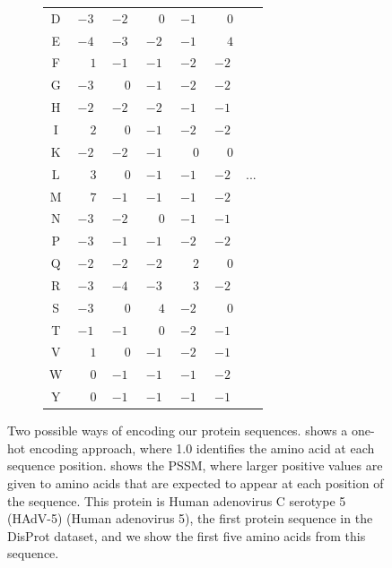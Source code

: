 \documentclass{l4proj}
\begin{document}
\begin{figure}[!ht]
\begin{subfigure}[h]{0.45\textwidth}
\begin{tabular}{|c|cccccc|}
        D & $-3$ & $-2$ & $\phantom{-}0$ & $-1$ & $\phantom{-}0$ & \\
        E & $-4$ & $-3$ & $-2$ & $-1$ & $\phantom{-}4$ & \\
        F & $\phantom{-}1$ & $-1$ & $-1$ & $-2$ & $-2$ & \\
        G & $-3$ & $\phantom{-}0$ & $-1$ & $-2$ & $-2$ & \\
        H & $-2$ & $-2$ & $-2$ & $-1$ & $-1$ & \\
        I & $\phantom{-}2$ & $\phantom{-}0$ & $-1$ & $-2$ & $-2$ & \\
        K & $-2$ & $-2$ & $-1$ & $\phantom{-}0$ & $\phantom{-}0$ & \\
        L & $\phantom{-}3$ & $\phantom{-}0$ & $-1$ & $-1$ & $-2$ & ... \\
        M & $\phantom{-}7$ & $-1$ & $-1$ & $-1$ & $-2$ & \\
        N & $-3$ & $-2$ & $\phantom{-}0$ & $-1$ & $-1$ & \\
        P & $-3$ & $-1$ & $-1$ & $-2$ & $-2$ & \\
        Q & $-2$ & $-2$ & $-2$ & $\phantom{-}2$ & $\phantom{-}0$ & \\
        R & $-3$ & $-4$ & $-3$ & $\phantom{-}3$ & $-2$ & \\
        S & $-3$ & $\phantom{-}0$ & $\phantom{-}4$ & $-2$ & $\phantom{-}0$ & \\
        T & $-1$ & $-1$ & $\phantom{-}0$ & $-2$ & $-1$ & \\
        V & $\phantom{-}1$ & $\phantom{-}0$ & $-1$ & $-2$ & $-1$ & \\
        W & $\phantom{-}0$ & $-1$ & $-1$ & $-1$ & $-2$ & \\
        Y & $\phantom{-}0$ & $-1$ & $-1$ & $-1$ & $-1$ & \\ \hline
        \end{tabular}
    \end{subfigure}
    \caption{Two possible ways of encoding our protein sequences.  shows a one-hot encoding approach, where 1.0 identifies the amino acid at each sequence position.  shows the PSSM, where larger positive values are given to amino acids that are expected to appear at each position of the sequence. This protein is Human adenovirus C serotype 5 (HAdV-5) (Human adenovirus 5), the first protein sequence in the DisProt dataset, and we show the first five amino acids from this sequence.
    }\label{fig:feature encoding}
\end{figure}
\end{document}
